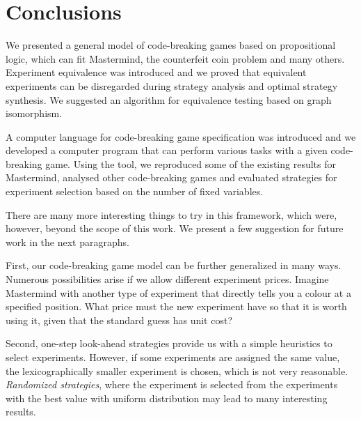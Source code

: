 \chapter{Conclusions}

We presented a general model of code-breaking games based on propositional logic,
  which can fit Mastermind, the counterfeit coin problem and many others.
Experiment equivalence was introduced and we proved that
  equivalent experiments can be disregarded during strategy analysis and
  optimal strategy synthesis.
We suggested an algorithm for equivalence
  testing based on graph isomorphism.

A computer language for code-breaking game specification was introduced
  and we developed a computer program that can perform various tasks
  with a given code-breaking game.
Using the tool, we reproduced some of the existing results for Mastermind,
  analysed other code-breaking games and
  evaluated strategies for experiment selection
  based on the number of fixed variables.

There are many more interesting things to try in this framework,
  which were, however, beyond the scope of this work.
We present a few suggestion for future work in the next paragraphs.

First, our code-breaking game model can be further generalized in many ways.
Numerous possibilities arise if we allow different experiment prices.
Imagine Mastermind with another type of experiment
  that directly tells you a colour at a specified position.
What price must the new experiment have so that
  it is worth using it, given that the standard guess has unit cost?


Second, one-step look-ahead strategies provide us with
  a simple heuristics to select experiments.
However, if some experiments are assigned the same value, the
  lexicographically smaller experiment is chosen,
  which is not very reasonable.
\emph{Randomized strategies},
  where the experiment is selected from the experiments
  with the best value with uniform distribution
  may lead to many interesting results.

